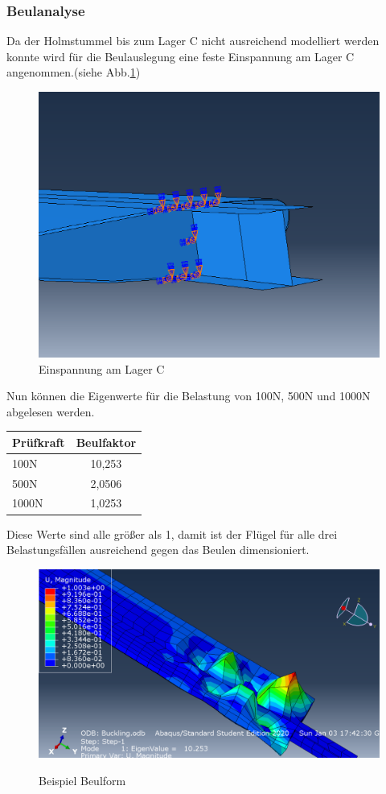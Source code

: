 \subsubsection{Beulanalyse}
Da der Holmstummel bis zum Lager C nicht ausreichend modelliert werden konnte wird für die Beulauslegung eine feste Einspannung am Lager C angenommen.(siehe Abb.\ref{BEinspannung})
\begin{figure}[h]
 \centering
 \includegraphics[scale=0.4]{Bilder/Beuleinspannung}
 \caption{Einspannung am Lager C}
 \label{BEinspannung}
\end{figure}
Nun können die Eigenwerte für die Belastung von 100N, 500N und 1000N abgelesen werden.
\begin{center}
\begin{tabular}[h]{l|c}
Prüfkraft&Beulfaktor\\
\hline
100N&10,253\\
500N&2,0506\\
1000N&1,0253\\
\end{tabular}
\end{center}

Diese Werte sind alle größer als 1, damit ist der Flügel für alle drei Belastungsfällen ausreichend gegen das Beulen dimensioniert.
\begin{figure}[h]
 \centering
 \includegraphics[scale=0.4]{Bilder/Beulen100N}
 \label{Beulform}
 \caption{Beispiel Beulform}
\end{figure}
\newpage

 

  
